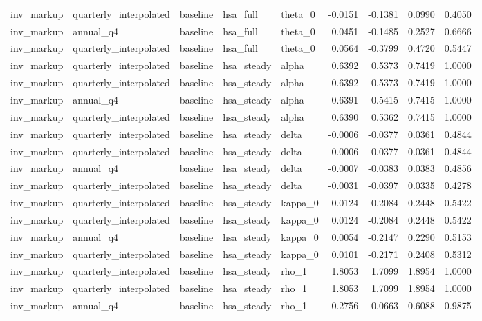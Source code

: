 \begin{tabular}{lllllrrrr}
inv\_markup & quarterly\_interpolated & baseline & hsa\_full & theta\_0 & -0.0151 & -0.1381 & 0.0990 & 0.4050 \\
inv\_markup & annual\_q4 & baseline & hsa\_full & theta\_0 & 0.0451 & -0.1485 & 0.2527 & 0.6666 \\
inv\_markup & quarterly\_interpolated & baseline & hsa\_full & theta\_0 & 0.0564 & -0.3799 & 0.4720 & 0.5447 \\
inv\_markup & quarterly\_interpolated & baseline & hsa\_steady & alpha & 0.6392 & 0.5373 & 0.7419 & 1.0000 \\
inv\_markup & quarterly\_interpolated & baseline & hsa\_steady & alpha & 0.6392 & 0.5373 & 0.7419 & 1.0000 \\
inv\_markup & annual\_q4 & baseline & hsa\_steady & alpha & 0.6391 & 0.5415 & 0.7415 & 1.0000 \\
inv\_markup & quarterly\_interpolated & baseline & hsa\_steady & alpha & 0.6390 & 0.5362 & 0.7415 & 1.0000 \\
inv\_markup & quarterly\_interpolated & baseline & hsa\_steady & delta & -0.0006 & -0.0377 & 0.0361 & 0.4844 \\
inv\_markup & quarterly\_interpolated & baseline & hsa\_steady & delta & -0.0006 & -0.0377 & 0.0361 & 0.4844 \\
inv\_markup & annual\_q4 & baseline & hsa\_steady & delta & -0.0007 & -0.0383 & 0.0383 & 0.4856 \\
inv\_markup & quarterly\_interpolated & baseline & hsa\_steady & delta & -0.0031 & -0.0397 & 0.0335 & 0.4278 \\
inv\_markup & quarterly\_interpolated & baseline & hsa\_steady & kappa\_0 & 0.0124 & -0.2084 & 0.2448 & 0.5422 \\
inv\_markup & quarterly\_interpolated & baseline & hsa\_steady & kappa\_0 & 0.0124 & -0.2084 & 0.2448 & 0.5422 \\
inv\_markup & annual\_q4 & baseline & hsa\_steady & kappa\_0 & 0.0054 & -0.2147 & 0.2290 & 0.5153 \\
inv\_markup & quarterly\_interpolated & baseline & hsa\_steady & kappa\_0 & 0.0101 & -0.2171 & 0.2408 & 0.5312 \\
inv\_markup & quarterly\_interpolated & baseline & hsa\_steady & rho\_1 & 1.8053 & 1.7099 & 1.8954 & 1.0000 \\
inv\_markup & quarterly\_interpolated & baseline & hsa\_steady & rho\_1 & 1.8053 & 1.7099 & 1.8954 & 1.0000 \\
inv\_markup & annual\_q4 & baseline & hsa\_steady & rho\_1 & 0.2756 & 0.0663 & 0.6088 & 0.9875 \\

\end{tabular}
